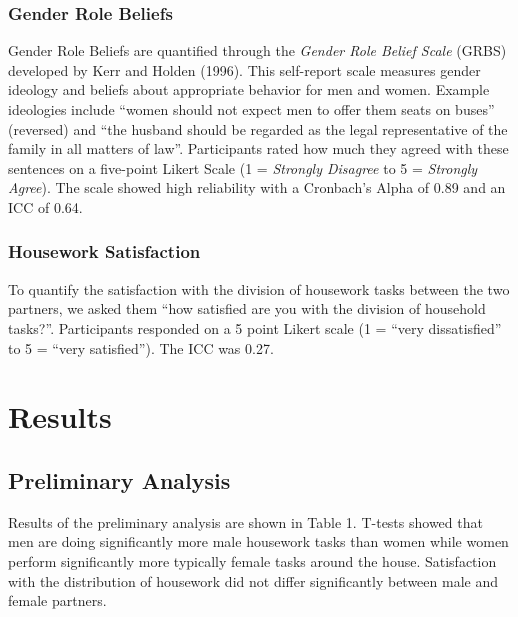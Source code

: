 \documentclass[
  man,floatsintext]{apa6}
\begin{document}
\hypertarget{gender-role-beliefs}{%
\subsubsection{Gender Role Beliefs}\label{gender-role-beliefs}}

Gender Role Beliefs are quantified through the \emph{Gender Role Belief Scale} (GRBS) developed by Kerr and Holden (1996). This self-report scale measures gender ideology and beliefs about appropriate behavior for men and women. Example ideologies include ``women should not expect men to offer them seats on buses'' (reversed) and ``the husband should be regarded as the legal representative of the family in all matters of law''. Participants rated how much they agreed with these sentences on a five-point Likert Scale (1 = \emph{Strongly Disagree} to 5 = \emph{Strongly Agree}). The scale showed high reliability with a Cronbach's Alpha of 0.89 and an ICC of 0.64.

\hypertarget{housework-satisfaction}{%
\subsubsection{Housework Satisfaction}\label{housework-satisfaction}}

To quantify the satisfaction with the division of housework tasks between the two partners, we asked them ``how satisfied are you with the division of household tasks?''. Participants responded on a 5 point Likert scale (1 = ``very dissatisfied'' to 5 = ``very satisfied''). The ICC was 0.27.

\hypertarget{results}{%
\section{Results}\label{results}}

\hypertarget{preliminary-analysis}{%
\subsection{Preliminary Analysis}\label{preliminary-analysis}}

Results of the preliminary analysis are shown in Table 1. T-tests showed that men are doing significantly more male housework tasks than women while women perform significantly more typically female tasks around the house. Satisfaction with the distribution of housework did not differ significantly between male and female partners.
\end{document}
